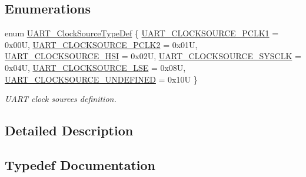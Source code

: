 \subsection*{Enumerations}
\begin{DoxyCompactItemize}
\item 
enum \mbox{\hyperlink{group___u_a_r_t___exported___types_gad957348fe227e5cb75b70be026c5ae81}{U\+A\+R\+T\+\_\+\+Clock\+Source\+Type\+Def}} \{ \newline
\mbox{\hyperlink{group___u_a_r_t___exported___types_ggad957348fe227e5cb75b70be026c5ae81a96ac2df7b663207f2e8be97e0e18a3bb}{U\+A\+R\+T\+\_\+\+C\+L\+O\+C\+K\+S\+O\+U\+R\+C\+E\+\_\+\+P\+C\+L\+K1}} = 0x00U, 
\mbox{\hyperlink{group___u_a_r_t___exported___types_ggad957348fe227e5cb75b70be026c5ae81a9935c585901e1c6de3056f38e6be8748}{U\+A\+R\+T\+\_\+\+C\+L\+O\+C\+K\+S\+O\+U\+R\+C\+E\+\_\+\+P\+C\+L\+K2}} = 0x01U, 
\mbox{\hyperlink{group___u_a_r_t___exported___types_ggad957348fe227e5cb75b70be026c5ae81af4da147f3b62642e1ce6d2cb22aff32e}{U\+A\+R\+T\+\_\+\+C\+L\+O\+C\+K\+S\+O\+U\+R\+C\+E\+\_\+\+H\+SI}} = 0x02U, 
\mbox{\hyperlink{group___u_a_r_t___exported___types_ggad957348fe227e5cb75b70be026c5ae81ab9abf4484d0f83bf9b3ccc8ef72a592e}{U\+A\+R\+T\+\_\+\+C\+L\+O\+C\+K\+S\+O\+U\+R\+C\+E\+\_\+\+S\+Y\+S\+C\+LK}} = 0x04U, 
\newline
\mbox{\hyperlink{group___u_a_r_t___exported___types_ggad957348fe227e5cb75b70be026c5ae81ab9335bad77171144c2994f1554ce3901}{U\+A\+R\+T\+\_\+\+C\+L\+O\+C\+K\+S\+O\+U\+R\+C\+E\+\_\+\+L\+SE}} = 0x08U, 
\mbox{\hyperlink{group___u_a_r_t___exported___types_ggad957348fe227e5cb75b70be026c5ae81a9012cc24ac82c0d7aa7558f73d770eab}{U\+A\+R\+T\+\_\+\+C\+L\+O\+C\+K\+S\+O\+U\+R\+C\+E\+\_\+\+U\+N\+D\+E\+F\+I\+N\+ED}} = 0x10U
 \}
\begin{DoxyCompactList}\small\item\em U\+A\+RT clock sources definition. \end{DoxyCompactList}\end{DoxyCompactItemize}


\subsection{Detailed Description}


\subsection{Typedef Documentation}
\mbox{\label{group___u_a_r_t___exported___types_ga94c58ae1f4dbcf6032224edfc93a6e19}} 
